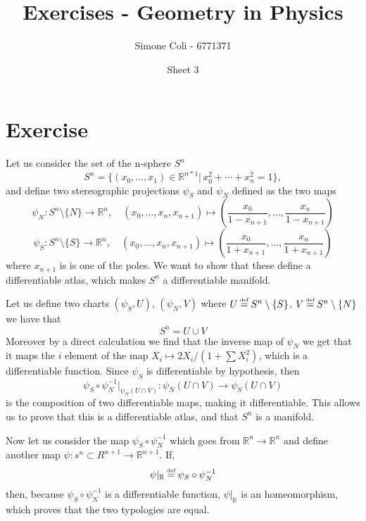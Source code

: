 \documentclass{article}
\title{Exercises - Geometry in Physics}
\author{Simone Coli - 6771371}
\date{Sheet 3}
\newcommand*{\eqdef}{\ensuremath{\overset{\mathclap{\text{\tiny def}}}{=}}}
\begin{document}
\maketitle
\section{Exercise}
Let us consider the set of the n-sphere $S^n$
\[
    S^n = \{ (x_0, \dots, x_1) \in \mathbb{R}^{n*1} |\, x_0^2 + \cdots + x_n^2 = 1 \},
\]
and define two stereographic projections $\psi_S$ and $\psi_N$ defined as the two maps
\[
    \psi_N : S^n \setminus \{ N \} \to \mathbb{R}^n, \quad (x_0, \dots, x_n, x_{n+1}) \mapsto \left( \frac{x_0}{1-x_{n+1}}, \dots ,\frac{x_n}{1-x_{n+1}} \right)
\]
\[
    \psi_S : S^n \setminus \{ S \} \to \mathbb{R}^n, \quad (x_0, \dots, x_n, x_{n+1}) \mapsto \left( \frac{x_0}{1+x_{n+1}}, \dots ,\frac{x_n}{1+x_{n+1}} \right)
\]
where $x_{n+1}$ is is one of the poles. We want to show that these define a differentiable atlas, which makes $S^n$ a differentiable manifold.

Let us define two charts $(\psi_S, U)$, $(\psi_N, V)$ where $U \eqdef S^n \setminus \{ S \}$, $V \eqdef S^n \setminus \{ N \}$ we have that
\[
    S^n = U \cup V
\]
Moreover by a direct calculation we find that the inverse map of $\psi_N$ we get that it maps the $i$ element of the map $X_i \mapsto 2X_i/(1+\sum X_i^2)$, which is a differentiable function. Since $\psi_S$ is differentiable by hypothesis, then
\[
    \psi_S \circ \psi_N^{-1}|_{\psi_N (U\cap V)}: \psi_N(U \cap V) \to \psi_S(U\cap V)
\]
is the composition of two differentiable maps, making it differentiable. This allows us to prove that this is a differentiable atlas, and that $S^n$ is a manifold.

Now let us consider the map $\psi_S \circ \psi_N^{-1}$ which goes from $\mathbb R^n \to \mathbb R^n$ and define another map $\psi: s^n \subset R^{n+1} \to \mathbb R^{n+1}$. If,
\[
    \psi|_\mathbb R \eqdef \psi_S \circ \psi_N^{-1}
\]
then, because $\psi_S \circ \psi_N^{-1}$ is a differentiable function, $\psi|_\mathbb R$ is an homeomorphism, which proves that the two typologies are equal.
\end{document}
